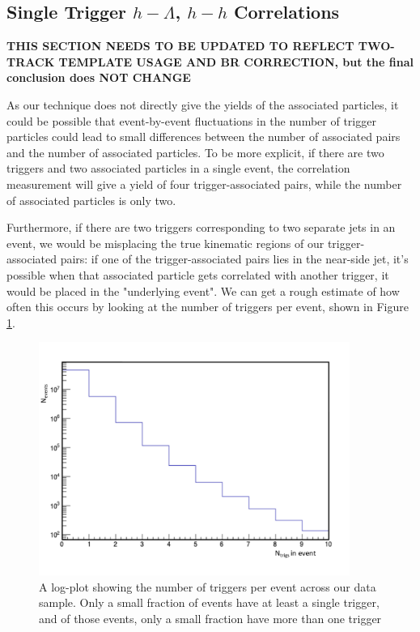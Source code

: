 \documentclass[ALICE,manyauthors]{ALICE_analysis_notes}
\begin{document}
\clearpage

\subsection{Single Trigger $h-\Lambda$, $h-h$ Correlations}

\textbf{THIS SECTION NEEDS TO BE UPDATED TO REFLECT TWO-TRACK TEMPLATE USAGE AND BR CORRECTION, but the final conclusion does NOT CHANGE}

As our technique does not directly give the yields of the associated particles, it could be possible that event-by-event fluctuations in the number of trigger particles could lead to small differences between the number of associated pairs and the number of associated particles. To be more explicit, if there are two triggers and two associated particles in a single event, the correlation measurement will give a yield of four trigger-associated pairs, while the number of associated particles is only two. 

Furthermore, if there are two triggers corresponding to two separate jets in an event, we would be misplacing the true kinematic regions of our trigger-associated pairs: if one of the trigger-associated pairs lies in the near-side jet, it's possible when that associated particle gets correlated with another trigger, it would be placed in the "underlying event". We can get a rough estimate of how often this occurs by looking at the number of triggers per event, shown in Figure \ref{trigs_per_event}.

\begin{figure}[ht]
\centering
\includegraphics[width=4in]{figures/trig_per_event.pdf}
\caption{A log-plot showing the number of triggers per event across our data sample. Only a small fraction of events have at least a single trigger, and of those events, only a small fraction have more than one trigger}
\label{trigs_per_event}
\end{figure}
\end{document}
